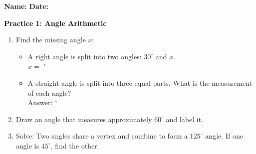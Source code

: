 \documentclass[12pt, letterpaper, fleqn]{article}
\newcommand{\blank}{\underline{\hspace{2.2cm}}}
\begin{document}
\textbf{Name:} \underline{\hspace{5cm}}
\hfill
\textbf{Date:} \underline{\hspace{3cm}}\\

\begin{tcolorbox}[colback=customteal!20]
    \large\textcolor{black}{\textbf{Practice 1: Angle Arithmetic}}
\end{tcolorbox}

\vspace{5mm}
\begin{enumerate}[itemsep=3cm, leftmargin=0.6cm]
\item Find the missing angle $x$:
  \begin{itemize}[itemsep=1cm]
    \item A right angle is split into two angles: $30^\circ$ and $x$. \\ $x =$ \blank $^\circ$
    \item A straight angle is split into three equal parts. What is the measurement of each angle? \\ Answer: \blank $^\circ$
  \end{itemize}

\item Draw an angle that measures approximately $60^\circ$ and label it.
\vspace{4cm}

\item Solve: Two angles share a vertex and combine to form a $125^\circ$ angle. If one angle is $45^\circ$, find the other.
\end{enumerate}
\end{document}
